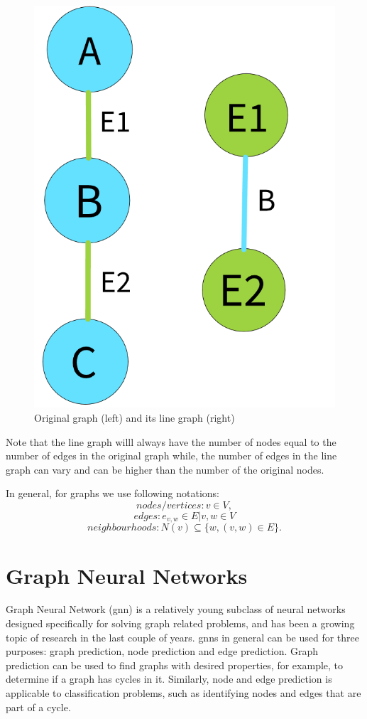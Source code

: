 \begin{figure}[H]
    \centering
    \includegraphics[scale=0.3]{figures/LineGraphExample}
    \caption{Original graph (left) and its line graph (right)}
    \label{Line graph figure}
\end{figure}

Note that the line graph willl always have the number of nodes equal to the number of edges in the original graph while, the number of edges in the line graph can vary and can be higher than the number of the original nodes.

In general, for graphs we use following notations: 
$$nodes/vertices: v \in V,$$
$$edges: e_{v,w} \in E | v, w \in V$$
$$neighbourhoods: N(v) \subseteq \{w, (v,w) \in E\}.$$ 

\section{Graph Neural Networks}
\label{sec:graphneuralnetworks}
Graph Neural Network (\gls{gnn}) is a relatively young subclass of neural networks designed specifically for solving graph related problems, and has been a growing topic of research in the last couple of years. \gls{gnn}s in general can be used for three purposes: graph prediction, node prediction and edge prediction. Graph prediction can be used to find graphs with desired properties, for example, to determine if a graph has cycles in it. Similarly, node and edge prediction is applicable to classification problems, such as identifying nodes and edges that are part of a cycle.

